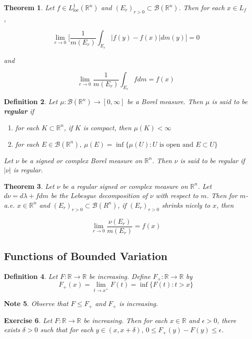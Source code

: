 \documentclass[12pt]{amsart}
\newtheorem{thm}{Theorem}[section]
\newtheorem{defn}[thm]{Definition}
\newtheorem{note}[thm]{Note}
\newtheorem{ex}[thm]{Exercise}
\newcommand{\del}{\delta}
\newcommand{\lam}{\lambda}
\newcommand{\ep}{\epsilon}
\newcommand{\R}{\mathbb{R}}
\newcommand{\MB}{\mathcal{B}}
\newcommand{\RG}{[0,\infty]}
\newcommand{\Ll}{L^1_{\text{loc}}(\R^n)}
\begin{document}
\begin{thm}
Let $f \in \Ll$ and $(E_r)_{r>0} \subset \MB(\R^n)$. Then for each $x \in L_f$, 

$$\lim_{r \rightarrow 0} \bigg[ \frac{1}{m(E_r)}\int_{E_r}|f(y) - f(x)|dm(y)\bigg] =0$$

and 

$$\lim_{r \rightarrow 0}  \frac{1}{m(E_r)}\int_{E_r}fdm = f(x)$$
\end{thm}

\begin{defn}
Let $\mu:\MB(\R^n) \rightarrow \RG$ be a Borel measure. Then $\mu$ is said to be \textbf{regular} if 
\begin{enumerate}
\item for each $K \subset \R^n$, if $K$ is compact, then $\mu(K)< \infty$
\item for each $E \in \MB(\R^n)$, $\mu(E) = \inf \{\mu(U): U \text{ is open and }E \subset U\}$
\end{enumerate}

Let $\nu$ be a signed or complex Borel measure on $\R^n$. Then $\nu$ is said to be regular if $|\nu|$ is regular.
\end{defn}

\begin{thm}
Let $\nu$ be a regular signed or complex measure on $\R^n$. Let $d\nu = d\lam + f dm$ be the Lebesgue decomposition of $\nu$ with respect to $m$. Then for $m$-a.e. $x \in \R^n$ and $(E_r)_{r >0} \subset \MB(R^n)$, if $(E_r)_{r >0}$ shrinks nicely to $x$, then 

$$\lim_{r \rightarrow 0} \frac{\nu(E_r)}{m(E_r)} = f(x)$$
\end{thm}

\subsection{Functions of Bounded Variation}

\begin{defn}
Let $F:\R \rightarrow \R$ be increasing. Define $F_+:\R \rightarrow \R$ by $$F_+(x) = \lim_{t \rightarrow x^+}F(t) = \inf \{F(t): t>x \}$$
\end{defn}

\begin{note}
Observe that $F \leq F_+$ and $F_+$ is increasing.
\end{note}

\begin{ex}
Let $F:\R \rightarrow \R$ be increasing. Then for each $x \in \R$ and $ \ep>0$, there exists $\del >0$ such that for each $y \in (x,x+\del)$, $0 \leq F_+(y) - F(y) \leq \ep$.
\end{ex}
\end{document}
